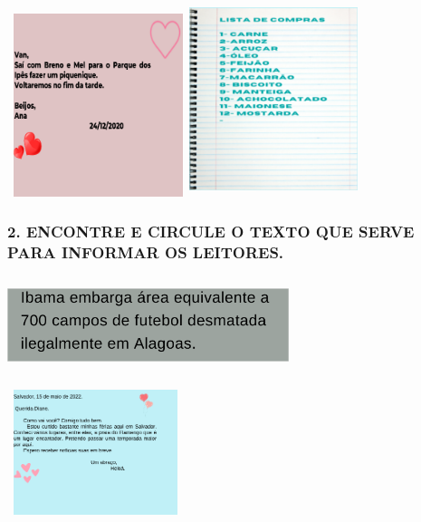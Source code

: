 \includegraphics[width=2.09375in,height=2.10278in]{media/image139.png}\includegraphics[width=1.94236in,height=2.23611in]{media/image140.png}

\subsubsection{2. ENCONTRE E CIRCULE O TEXTO QUE SERVE PARA INFORMAR OS
LEITORES.
}\label{encontre-e-circule-o-texto-que-serve-para-informar-os-leitores.}

\includegraphics[width=3.23889in,height=1.08958in]{media/image141.png}

\includegraphics[width=2.03472in,height=1.44444in]{media/image142.png}

